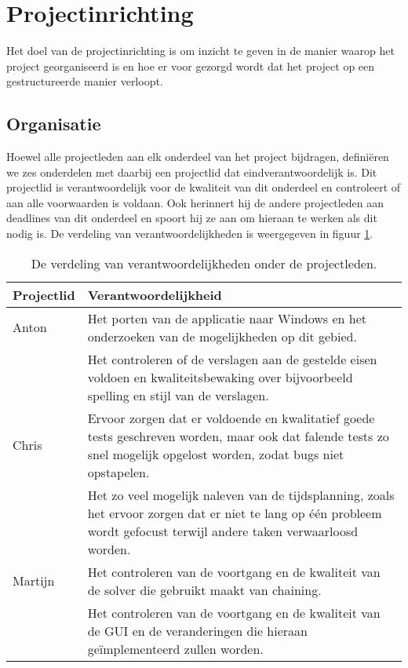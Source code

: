 \section{Projectinrichting}
Het doel van de projectinrichting is om inzicht te geven in de manier waarop het project georganiseerd is en hoe er voor gezorgd wordt dat het project op een gestructureerde manier verloopt.

\subsection{Organisatie}
Hoewel alle projectleden aan elk onderdeel van het project bijdragen, definiëren we zes onderdelen met daarbij een projectlid dat eindverantwoordelijk is. Dit projectlid is verantwoordelijk voor de kwaliteit van dit onderdeel en controleert of aan alle voorwaarden is voldaan. Ook herinnert hij de andere projectleden aan deadlines van dit onderdeel en spoort hij ze aan om hieraan te werken als dit nodig is. De verdeling van verantwoordelijkheden is weergegeven in figuur \ref{fig:organisatie}.

\begin{table}[!h]
\label{fig:organisatie}
\def\arraystretch{1.5}
\begin{tabularx}{\textwidth}{|p{2cm}|X|}
\hline
\textbf{Projectlid} & \textbf{Verantwoordelijkheid} \\ \hline
Anton & Het porten van de applicatie naar Windows en het onderzoeken van de mogelijkheden op dit gebied. \\ \cline{2-2}
& Het controleren of de verslagen aan de gestelde eisen voldoen en kwaliteitsbewaking over bijvoorbeeld spelling en stijl van de verslagen. \\ \hline
Chris & Ervoor zorgen dat er voldoende en kwalitatief goede tests geschreven worden, maar ook dat falende tests zo snel mogelijk opgelost worden, zodat bugs niet opstapelen. \\ \cline{2-2}
& Het zo veel mogelijk naleven van de tijdsplanning, zoals het ervoor zorgen dat er niet te lang op één probleem wordt gefocust terwijl andere taken verwaarloosd worden. \\ \hline
Martijn & Het controleren van de voortgang en de kwaliteit van de solver die gebruikt maakt van chaining. \\ \cline{2-2}
& Het controleren van de voortgang en de kwaliteit van de GUI en de veranderingen die hieraan ge\"implementeerd zullen worden. \\ \hline
\end{tabularx}
\caption{De verdeling van verantwoordelijkheden onder de projectleden.}
\end{table}

